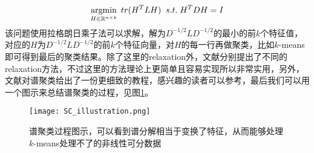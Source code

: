 \begin{equation*}
    \label{eq: relax_spectral_clustering}
    \operatorname*{argmin}\limits_{H \in \mathbb{R}^{n \times k}} \; tr(H^TLH) \;\; s.t.\;H^TDH=I
\end{equation*}
该问题使用拉格朗日乘子法可以求解，解为$D^{-1/2}LD^{-1/2}$的最小的前$k$个特征值，对应的$H$为$D^{-1/2}LD^{-1/2}$的前$k$个特征向量，对$H$的每一行再做聚类，比如$k$-means即可得到最后的聚类结果。除了这里的relaxation外，文献\cite{bie2006fast,bresson2013multiclass,rangapuram2014tight,rangapuram2016graph}分别提出了不同的relaxation方法，不过这里的方法理论上更简单且容易实现所以非常实用，另外，文献\cite{von2007tutorial}对谱聚类给出了一份更细致的教程，感兴趣的读者可以参考，最后我们可以用一个图示来总结谱聚类的过程，见图\ref{fig: SC_illustration}。
\begin{figure}
    \texttt{[image: SC\_illustration.png]}
    \caption{谱聚类过程图示，可以看到谱分解相当于变换了特征，从而能够处理$k$-means处理不了的非线性可分数据}
    \label{fig: SC_illustration}
\end{figure}